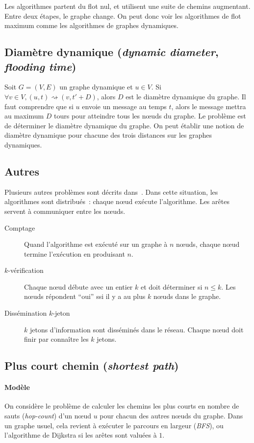 \documentclass[12pt,a4paper]{article}
\begin{document}
Les algorithmes partent du flot nul, et utilisent une suite de chemins
augmentant. Entre deux étapes, le graphe change. On peut donc voir les
algorithmes de flot maximum comme les algorithmes de graphes
dynamiques.

\subsection{Diamètre dynamique (\textit{dynamic diameter},
  \textit{flooding time})}
Soit \(G = (V, E)\) un graphe dynamique et \(u \in V\). Si
\(\forall v \in V, (u, t) \rightsquigarrow (v, t' + D)\), alors \(D\)
est le diamètre dynamique du graphe. Il faut comprendre que si \(u\)
envoie un message au temps \(t\), alors le message mettra au maximum
\(D\) tours pour atteindre tous les nœuds du graphe. Le problème est
de déterminer le diamètre dynamique du graphe. On peut établir une
notion de diamètre dynamique pour chacune des trois distances sur les
graphes dynamiques.

\subsection{Autres}
Plusieurs autres problèmes sont décrits
dans~\cite{DBLP:conf/stoc/KuhnLO10}. Dans cette situation, les
algorithmes sont distribués~: chaque nœud exécute l'algorithme. Les
arêtes servent à communiquer entre les nœuds.
\begin{description}
\item[Comptage] Quand l'algorithme est exécuté sur un graphe à \(n\)
  nœuds, chaque nœud termine l'exécution en produisant \(n\).
\item[\(k\)-vérification] Chaque nœud débute avec un entier \(k\) et
  doit déterminer si \(n \leq k\). Les nœuds répondent ``oui'' ssi il
  y a au plus \(k\) nœuds dans le graphe.
\item[Dissémination \(k\)-jeton] \(k\) jetons d'information sont
  disséminés dans le réseau. Chaque nœud doit finir par connaître les
  \(k\) jetons.
\end{description}

\subsection{Plus court chemin (\textit{shortest path})}

\paragraph{Modèle}
On considère le problème de calculer les chemins les plus courts en
nombre de sauts (\textit{hop-count}) d'un nœud \(u\) pour chacun des
autres nœuds du graphe. Dans un graphe usuel, cela revient à exécuter
le parcours en largeur (\textit{BFS}), ou l'algorithme de Dijkstra si
les arêtes sont valuées à \(1\).
\end{document}
